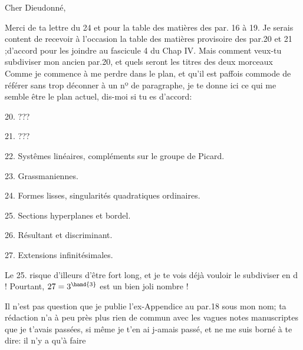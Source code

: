 

Cher Dieudonné,

Merci de ta lettre du 24  et pour la table des matières des par.
16 à 19.  Je serais content de recevoir à l'occasion la table des
matières provisoire des par.20 et 21 ;d'accord pour les joindre au
fascicule 4 du Chap IV. Mais comment veux-tu  subdiviser mon ancien par.20, et
quels seront les titres des deux morceaux  Comme je commence à me
perdre dans le plan, et qu'il est paffois commode de  référer
sans trop déconner à un nº de paragraphe, je te donne ici ce qui me
semble être le plan actuel, dis-moi si tu es d'accord:

20.  ???

21.  ???

22.  Systêmes linéaires, compléments sur le groupe de Picard.

23.  Grassmaniennes.

24.  Formes lisses, singularités quadratiques ordinaires.

25.  Sections hyperplanes et bordel.

26.  Résultant et discriminant.

27.  Extensions infinitésimales.

Le 25.  risque d'illeurs d'être fort long, et je te vois déjà
vouloir le subdiviser en d !  Pourtant, $27=3^{\hand{3}}$ est un bien joli
nombre !

Il n'est pas question que je publie l'ex-Appendice au par.18
sous mon nom; ta rédaction n'a à peu près plus rien de commun avec
les vagues notes manuscriptes que je t'avais passées, si même je t'en
ai j-amais passé, et ne me suis borné à te dire: il n'y a qu'à faire

